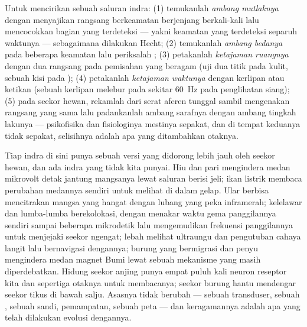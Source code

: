 \begin{method}\label{met:b3:sensory-systems:psychophysics}
Untuk mencirikan sebuah saluran indra: (1) temukanlah \emph{ambang
mutlaknya} dengan menyajikan rangsang berkeamatan berjenjang berkali-kali lalu
mencocokkan bagian yang terdeteksi --- yakni keamatan yang terdeteksi separuh waktunya
--- sebagaimana dilakukan Hecht; (2) temukanlah \emph{ambang bedanya} pada beberapa
keamatan lalu periksalah ; (3) petakanlah \emph{ketajaman ruangnya} dengan
dua rangsang pada pemisahan yang beragam (uji dua titik pada kulit, sebuah
kisi pada ); (4) petakanlah \emph{ketajaman waktunya} dengan kerlipan
atau ketikan (sebuah kerlipan melebur pada sekitar \qty{60}{Hz} pada penglihatan siang);
(5) pada seekor hewan, rekamlah dari serat aferen tunggal sambil mengenakan
rangsang yang sama lalu padankanlah ambang sarafnya dengan ambang tingkah lakunya
--- psikofisika dan fisiologinya mestinya sepakat, dan di tempat keduanya
tidak sepakat, selisihnya adalah apa yang ditambahkan otaknya.
\end{method}

\begin{remark}\label{rem:b3:sensory-systems:others}
Tiap indra di sini punya sebuah versi yang didorong lebih jauh oleh seekor hewan, dan ada
indra yang tidak kita punyai. Hiu dan pari mengindera medan mikrovolt
detak jantung mangsanya lewat saluran berisi jeli; ikan listrik membaca
perubahan medannya sendiri untuk melihat di dalam gelap. Ular berbisa mencitrakan
mangsa yang hangat dengan lubang yang peka inframerah; kelelawar dan lumba-lumba berekolokasi,
dengan menakar waktu gema panggilannya sendiri sampai beberapa mikrodetik lalu mengemudikan
frekuensi panggilannya untuk menjejaki seekor ngengat; lebah melihat ultraungu dan
pengutuban cahaya langit lalu bernavigasi dengannya; burung yang bermigrasi dan
penyu mengindera medan magnet Bumi lewat sebuah mekanisme yang masih
diperdebatkan. Hidung seekor anjing punya empat puluh kali neuron reseptor kita dan sepertiga
otaknya untuk membacanya; seekor burung hantu mendengar seekor tikus di bawah salju.
Asasnya tidak berubah --- sebuah transduser, sebuah , sebuah sandi,
pemampatan, sebuah peta --- dan keragamannya adalah apa yang telah dilakukan evolusi
dengannya.
\end{remark}

